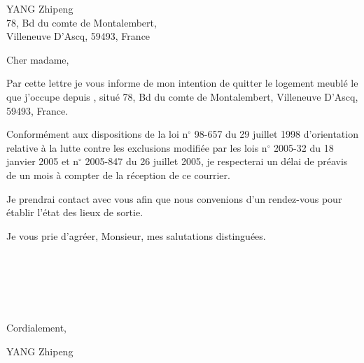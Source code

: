 \documentclass{letter}
\begin{document}
\begin{letter}{YANG Zhipeng\\78, Bd du comte de Montalembert,\\ Villeneuve D'Ascq, 59493, France}
\opening{Cher madame,}
Par cette lettre je vous informe de mon intention de quitter le logement meubl\'e le \underline{\phantom{yyyyyyyymmmmdddd}} que j'occupe depuis \underline{\phantom{yyyyyyyymmmmdddd}}, situ\'e 78, Bd du comte de Montalembert, Villeneuve D'Ascq, 59493, France.

Conform\'ement aux dispositions de la loi n$^{\circ}$ 98-657 du 29 juillet 1998 d'orientation relative \`a la lutte contre les exclusions modifi\'ee par les lois n$^{\circ}$ 2005-32 du 18 janvier 2005 et n$^{\circ}$ 2005-847 du 26 juillet 2005, je respecterai un d\'elai de pr\'eavis de un mois \`a compter de la r\'eception de ce courrier.

Je prendrai contact avec vous afin que nous convenions d'un rendez-vous pour \'etablir l'\'etat des lieux de sortie.

Je vous prie d'agr\'eer, Monsieur, mes salutations distingu\'ees.
\\\\\\\\\\\\
\begin{flushright}
Cordialement,

YANG Zhipeng
\end{flushright}
\end{letter}
\end{document}

